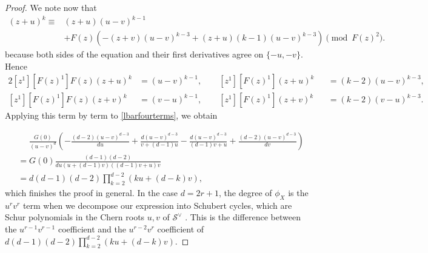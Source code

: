 \documentclass[12pt]{amsart}
\newcommand{\mc}{\mathcal}
\theoremstyle{plain}
\theoremstyle{definition}
\theoremstyle{remark}
\begin{document}
\begin{proof}
We note now that 
\begin{align*}
(z+u)^k\equiv &(z+u)(u-v)^{k-1}\\
& +F(z)(-(z+v)(u-v)^{k-3}+(z+u)(k-1)(u-v)^{k-3}) \pmod{F(z)^2}.
\end{align*}
because both sides of the equation and their first derivatives agree on $\{-u, -v\}$. Hence 
\begin{alignat*}{2}
[z^1][F(z)^1] F(z)(z+u)^k &= (u-v)^{k-1},\qquad
[z^1][F(z)^1] (z+u)^k &&= (k-2)(u-v)^{k-3}, \\
[z^1][F(z)^1] F(z)(z+ v)^k &= (v-u)^{k-1},\qquad
[z^1][F(z)^1](z + v)^k &&= (k-2)(v-u)^{k-3}.
\end{alignat*} Applying this term by term to \eqref{lbarfourterms}, we obtain

\begin{align*}
&\phantom{=} \frac{G(0)}{(u - v)^d} \left(-\frac{(d-2)(u-v)^{d-3}}{du} + \frac{d(u-v)^{d-3}}{v+(d-1)u} - \frac{d(u-v)^{d-3}}{(d-1)v+u}+ \frac{(d-2)(u-v)^{d-3}}{dv} \right) \\
&=G(0)\frac{(d-1)(d-2)}{du(u+(d-1)v)((d-1)v+u)v}\\ &=d(d-1)(d-2)\prod_{k=2}^{d-2} (ku+(d-k)v),
\end{align*} 
which finishes the proof in general. In the case $d = 2r + 1$, the degree of $\phi_X$ is the $u^rv^r$ term when we decompose our expression into Schubert cycles, which are Schur polynomials in the Chern roots $u,v$ of $\mc{S}^{\vee}$ \cite[Chapter 10, Proposition 8]{FultonYoung}. This is the difference between the $u^{r-1}v^{r-1}$ coefficient and the $u^{r-2}v^{r}$ coefficient of $d(d-1)(d-2)\prod_{k=2}^{d-2} (ku+(d-k)v)$.
\end{proof}

\end{document}
